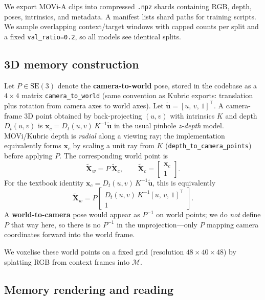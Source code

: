 \documentclass[11pt]{article}
\begin{document}
We export MOVi-A clips into compressed \texttt{.npz} shards containing RGB, depth, poses, intrinsics, and
metadata. A manifest lists shard paths for training scripts. We sample overlapping context/target windows with
capped counts per split and a fixed \texttt{val\_ratio=0.2}, so all models see identical splits.

\subsection{3D memory construction}
\label{sec:method-memory}

Let $P \in \mathrm{SE}(3)$ denote the \textbf{camera-to-world} pose, stored in the codebase as a
$4\times4$ matrix \texttt{camera\_to\_world} (same convention as Kubric exports: translation plus rotation
from camera axes to world axes).
Let $\tilde{\mathbf{u}}=[u,\,v,\,1]^\top$.
A camera-frame 3D point obtained by back-projecting $(u,v)$ with intrinsics $K$ and depth $D_t(u,v)$ is
$\mathbf{x}_c = D_t(u,v)\,K^{-1}\tilde{\mathbf{u}}$ in the usual pinhole \emph{z-depth} model.
MOVi/Kubric depth is \emph{radial} along a viewing ray; the implementation equivalently forms
$\mathbf{x}_c$ by scaling a unit ray from $K$ (\texttt{depth\_to\_camera\_points}) before applying $P$.
The corresponding world point is
\begin{equation}
\tilde{\mathbf{X}}_w = P\,\tilde{\mathbf{X}}_c,
\qquad
\tilde{\mathbf{X}}_c =
\begin{bmatrix}
\mathbf{x}_c \\[2pt] 1
\end{bmatrix}.
\end{equation}
For the textbook identity $\mathbf{x}_c = D_t(u,v)\,K^{-1}\tilde{\mathbf{u}}$, this is equivalently
\begin{equation}
\tilde{\mathbf{X}}_w = P
\begin{bmatrix}
D_t(u,v)\,K^{-1} [u,\, v,\, 1]^\top \\[2pt]
1
\end{bmatrix}.
\end{equation}
A \textbf{world-to-camera} pose would appear as $P^{-1}$ on world points; we do \emph{not} define $P$ that
way here, so there is no $P^{-1}$ in the unprojection---only $P$ mapping camera coordinates forward into
the world frame.

We voxelise these world points on a fixed grid (resolution $48{\times}40{\times}48$) by splatting RGB from
context frames into $\mathcal{M}$.

\subsection{Memory rendering and reading}
\label{sec:method-render}
\end{document}

